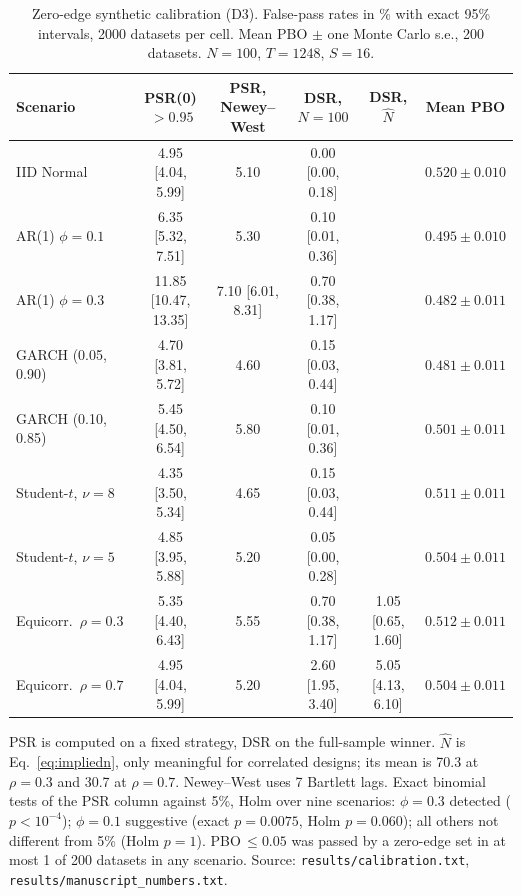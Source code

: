 \documentclass[11pt,a4paper]{article}
\begin{document}
\begin{table}[htbp]
\centering\small
\begin{threeparttable}
\footnotesize\setlength{\tabcolsep}{4pt}
\caption{Zero-edge synthetic calibration (D3). False-pass rates in \% with exact 95\% intervals, 2000 datasets per cell. Mean PBO $\pm$ one Monte Carlo s.e., 200 datasets. $N=100$, $T=1248$, $S=16$.}\label{tab:calibration}
\begin{tabular}{@{}lccccc@{}}
\toprule
Scenario & PSR(0)$\,>0.95$ & PSR, Newey--West & DSR, $N=100$ & DSR, $\hat N$ & Mean PBO \\
\midrule
IID Normal & 4.95 [4.04, 5.99] & 5.10 & 0.00 [0.00, 0.18] & & $0.520\pm0.010$ \\
AR(1) $\phi=0.1$ & 6.35 [5.32, 7.51] & 5.30 & 0.10 [0.01, 0.36] & & $0.495\pm0.010$ \\
AR(1) $\phi=0.3$ & 11.85 [10.47, 13.35] & 7.10 [6.01, 8.31] & 0.70 [0.38, 1.17] & & $0.482\pm0.011$ \\
GARCH (0.05, 0.90) & 4.70 [3.81, 5.72] & 4.60 & 0.15 [0.03, 0.44] & & $0.481\pm0.011$ \\
GARCH (0.10, 0.85) & 5.45 [4.50, 6.54] & 5.80 & 0.10 [0.01, 0.36] & & $0.501\pm0.011$ \\
Student-$t$, $\nu=8$ & 4.35 [3.50, 5.34] & 4.65 & 0.15 [0.03, 0.44] & & $0.511\pm0.011$ \\
Student-$t$, $\nu=5$ & 4.85 [3.95, 5.88] & 5.20 & 0.05 [0.00, 0.28] & & $0.504\pm0.011$ \\
Equicorr.\ $\rho=0.3$ & 5.35 [4.40, 6.43] & 5.55 & 0.70 [0.38, 1.17] & 1.05 [0.65, 1.60] & $0.512\pm0.011$ \\
Equicorr.\ $\rho=0.7$ & 4.95 [4.04, 5.99] & 5.20 & 2.60 [1.95, 3.40] & 5.05 [4.13, 6.10] & $0.504\pm0.011$ \\
\bottomrule
\end{tabular}
\begin{tablenotes}\footnotesize
\item PSR is computed on a fixed strategy, DSR on the full-sample winner. $\hat N$ is Eq.~\eqref{eq:impliedn}, only meaningful for correlated designs; its mean is 70.3 at $\rho=0.3$ and 30.7 at $\rho=0.7$. Newey--West uses 7 Bartlett lags. Exact binomial tests of the PSR column against 5\%, Holm over nine scenarios: $\phi=0.3$ detected ($p<10^{-4}$); $\phi=0.1$ suggestive (exact $p=0.0075$, Holm $p=0.060$); all others not different from 5\% (Holm $p=1$). PBO$\,\le0.05$ was passed by a zero-edge set in at most 1 of 200 datasets in any scenario. Source: \texttt{results/calibration.txt}, \texttt{results/manuscript\_numbers.txt}.
\end{tablenotes}
\end{threeparttable}
\end{table}
\end{document}
